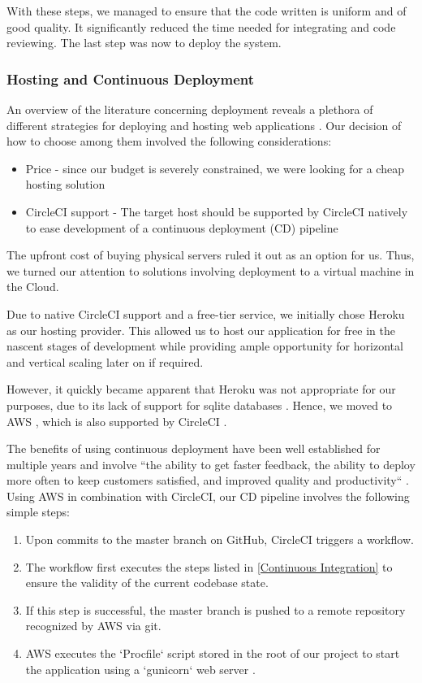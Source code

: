 \documentclass[main.tex]{subfiles}
\begin{document}
With these steps, we managed to ensure that the code written is uniform and of good quality. It significantly reduced the time needed for integrating and code reviewing. The last step was now to deploy the system.

\subsubsection{Hosting and Continuous Deployment}
\label{Continuous Deployment}

An overview of the literature concerning deployment reveals a plethora of different strategies for deploying and hosting web applications \cite{ConnollyFundamentals}. Our decision of how to choose among them involved the following considerations:

\begin{itemize}
    \item Price - since our budget is severely constrained, we were looking for a cheap hosting solution
    \item CircleCI support - The target host should be supported by CircleCI natively to ease development of a continuous deployment (CD) pipeline
\end{itemize}

The upfront cost of buying physical servers ruled it out as an option for us. Thus, we turned our attention to solutions involving deployment to a virtual machine in the Cloud.

Due to native CircleCI support and a free-tier service, we initially chose Heroku \cite{Heroku} as our hosting provider. This allowed us to host our application for free in the nascent stages of development while providing ample opportunity for horizontal and vertical scaling later on if required.

However, it quickly became apparent that Heroku was not appropriate for our purposes, due to its lack of support for sqlite databases \cite{HerokuSqlite}. Hence, we moved to AWS \cite{AWS}, which is also supported by CircleCI \cite{AWSCircleCI}.

The benefits of using continuous deployment have been well established for multiple years and involve ``the ability to get faster feedback, the ability to deploy more often to keep customers satisfied, and improved quality and productivity`` \cite{CDBenefits}. Using AWS in combination with CircleCI, our CD pipeline involves the following simple steps:

\begin{enumerate}
    \item Upon commits to the master branch on GitHub, CircleCI triggers a workflow.
    \item The workflow first executes the steps listed in \ref{Continuous Integration} to ensure the validity of the current codebase state.
    \item If this step is successful, the master branch is pushed to a remote repository recognized by AWS via git.
    \item AWS executes the `Procfile` script stored in the root of our project to start the application using a `gunicorn` web server \cite{Gunicorn}.
\end{enumerate}
\end{document}

